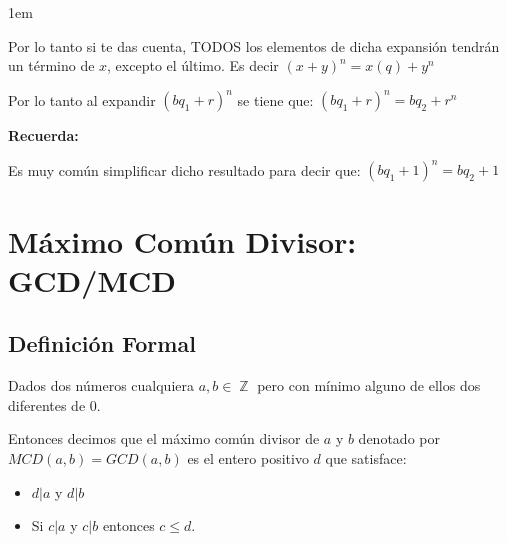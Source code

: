 \documentclass[12pt, fleqn]{report}                             %
\newenvironment{SmallIndentation}[1][0.75em]                    %
    {\begin{adjustwidth}{#1}{}\begin{footnotesize}}                 %
    {\end{footnotesize}\end{adjustwidth}}                           %
\DeclareMathOperator \Integers  {\mathbb{Z}}                     %
\begin{document}
\begin{itemize}
\begin{SmallIndentation}[1em]
                            Por lo tanto si te das cuenta, TODOS los elementos de dicha expansión tendrán 
                            un término de $x$, excepto el último.
                            Es decir $(x+y)^n = x(q) + y^n$

                            Por lo tanto al expandir $(bq_1 + r)^n$ se tiene que:
                            $(bq_1 + r)^n = bq_2 + r^n$

                            \textbf{Recuerda:}

                            Es muy común simplificar dicho resultado para decir que:
                            $(bq_1 + 1)^n = bq_2 + 1$


                    \end{SmallIndentation}

            \end{itemize}




    \clearpage
    \section{Máximo Común Divisor: GCD/MCD}

        \subsection*{Definición Formal}

            Dados dos números cualquiera $a, b \in \Integers$ pero con mínimo alguno de ellos dos diferentes
            de 0. 

            Entonces decimos que el máximo común divisor de $a$ y $b$ denotado por $MCD(a,b) = GCD(a,b)$
            es el entero positivo $d$ que satisface:

            \begin{itemize}
                \item $d|a$ y $d|b$
                \item Si $c|a$ y $c|b$ entonces $c \leq d$.
            \end{itemize}
\end{document}
